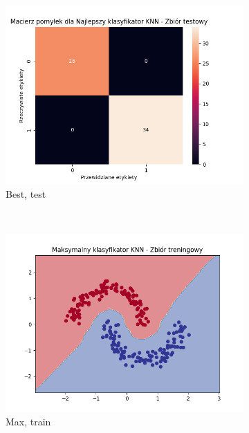 \documentclass[12pt]{article}
\newcommand*{\subfigwidth}{0.15\textwidth}
\begin{document}
\begin{figure}[H]
\begin{subfigure}[t]{\subfigwidth}
        \includegraphics[width=\linewidth]{img/exp_2/knn/2_2/best/test_matrix.png}
        \caption{Best, test}
    \end{subfigure} 
    \\
    \begin{subfigure}[t]{\subfigwidth}
        \includegraphics[width=\linewidth]{img/exp_2/knn/2_2/max/train_boundary.png}
        \caption{Max, train}
    \end{subfigure}
    \hfill
    \begin{subfigure}[t]{\subfigwidth}

\end{subfigure}
\end{figure}
\end{document}
